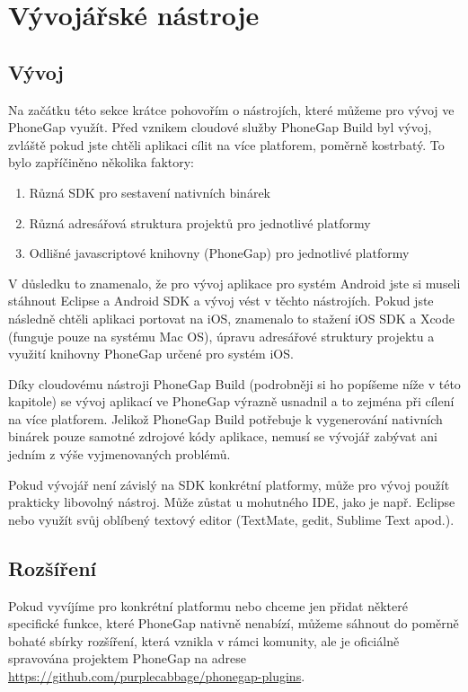 \section{Vývojářské nástroje}
\subsection{Vývoj}
Na začátku této sekce krátce pohovořím o nástrojích, které můžeme pro vývoj ve PhoneGap využít. Před vznikem cloudové služby PhoneGap Build byl vývoj, zvláště pokud jste chtěli aplikaci cílit na více platforem, poměrně kostrbatý. To bylo zapříčiněno několika faktory:

\begin{enumerate}
	\item Různá SDK pro sestavení nativních binárek
	\item Různá adresářová struktura projektů pro jednotlivé platformy
	\item Odlišné javascriptové knihovny (PhoneGap) pro jednotlivé platformy
\end{enumerate}

V důsledku to znamenalo, že pro vývoj aplikace pro systém Android jste si museli stáhnout Eclipse a Android SDK a vývoj vést v těchto nástrojích. Pokud jste následně chtěli aplikaci portovat na iOS, znamenalo to stažení iOS SDK a Xcode (funguje pouze na systému Mac OS), úpravu adresářové struktury projektu a využití knihovny PhoneGap určené pro systém iOS.

Díky cloudovému nástroji PhoneGap Build (podrobněji si ho popíšeme níže v této kapitole) se vývoj aplikací ve PhoneGap výrazně usnadnil a to zejména při cílení na více platforem. Jelikož PhoneGap Build potřebuje k vygenerování nativních binárek pouze samotné zdrojové kódy aplikace, nemusí se vývojář zabývat ani jedním z výše vyjmenovaných problémů.

Pokud vývojář není závislý na SDK konkrétní platformy, může pro vývoj použít prakticky libovolný nástroj. Může zůstat u mohutného IDE, jako je např. Eclipse nebo využít svůj oblíbený textový editor (TextMate, gedit, Sublime Text apod.).

\subsection{Rozšíření}
Pokud vyvíjíme pro konkrétní platformu nebo chceme jen přidat některé specifické funkce, které PhoneGap nativně nenabízí, můžeme sáhnout do poměrně bohaté sbírky rozšíření, která vznikla v rámci komunity, ale je oficiálně spravována projektem PhoneGap na adrese \url{https://github.com/purplecabbage/phonegap-plugins}. %

